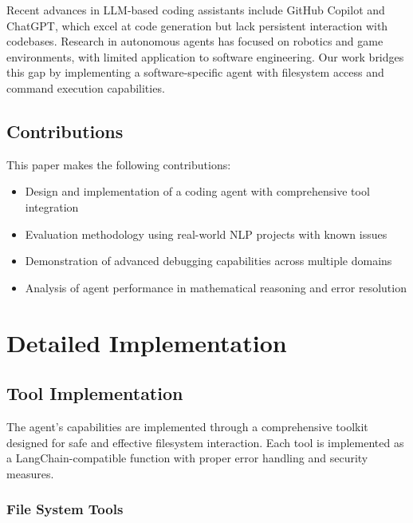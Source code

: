 \documentclass[12pt, a4paper]{article}
\begin{document}
Recent advances in LLM-based coding assistants include GitHub Copilot and ChatGPT, which excel at code generation but lack persistent interaction with codebases. Research in autonomous agents has focused on robotics and game environments, with limited application to software engineering. Our work bridges this gap by implementing a software-specific agent with filesystem access and command execution capabilities.

\subsection{Contributions}

This paper makes the following contributions:
\begin{itemize}
    \item Design and implementation of a coding agent with comprehensive tool integration
    \item Evaluation methodology using real-world NLP projects with known issues
    \item Demonstration of advanced debugging capabilities across multiple domains
    \item Analysis of agent performance in mathematical reasoning and error resolution
\end{itemize}

\section{Detailed Implementation}

\subsection{Tool Implementation}

The agent's capabilities are implemented through a comprehensive toolkit designed for safe and effective filesystem interaction. Each tool is implemented as a LangChain-compatible function with proper error handling and security measures.

\subsubsection{File System Tools}
\end{document}
